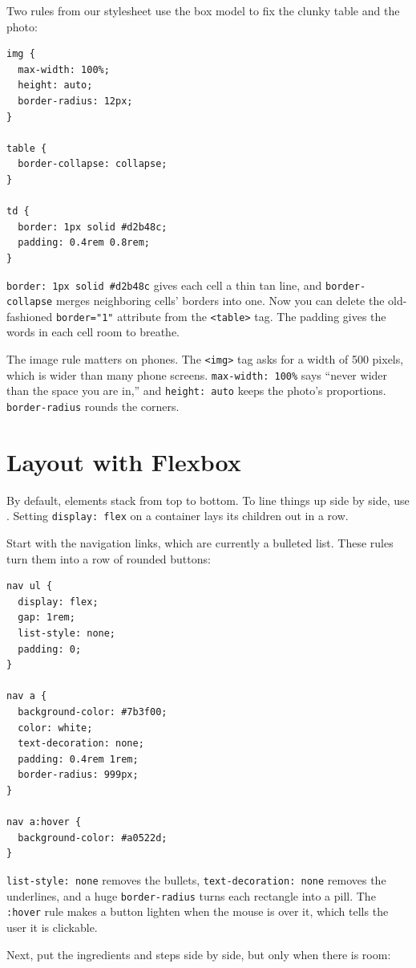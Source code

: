 Two rules from our stylesheet use the box model to fix the clunky table and the photo:

\begin{verbatim}
img {
  max-width: 100%;
  height: auto;
  border-radius: 12px;
}

table {
  border-collapse: collapse;
}

td {
  border: 1px solid #d2b48c;
  padding: 0.4rem 0.8rem;
}
\end{verbatim}

\verb|border: 1px solid #d2b48c| gives each cell a thin tan line, and \verb|border-collapse| merges
neighboring cells' borders into one. Now you can delete the old-fashioned \verb|border="1"| attribute from
the \verb|<table>| tag. The padding gives the words in each cell room to breathe.

The image rule matters on phones. The \verb|<img>| tag asks for a width of 500 pixels, which is wider than
many phone screens. \verb|max-width: 100%| says ``never wider than the space you are in,'' and
\verb|height: auto| keeps the photo's proportions. \verb|border-radius| rounds the corners.

\section{Layout with Flexbox}
By default, elements stack from top to bottom. To line things up side by side, use
. Setting \verb|display: flex| on a container lays its children out in a row.

Start with the navigation links, which are currently a bulleted list. These rules turn them into a row of
rounded buttons:

\begin{verbatim}
nav ul {
  display: flex;
  gap: 1rem;
  list-style: none;
  padding: 0;
}

nav a {
  background-color: #7b3f00;
  color: white;
  text-decoration: none;
  padding: 0.4rem 1rem;
  border-radius: 999px;
}

nav a:hover {
  background-color: #a0522d;
}
\end{verbatim}

\verb|list-style: none| removes the bullets, \verb|text-decoration: none| removes the underlines, and a
huge \verb|border-radius| turns each rectangle into a pill. The \verb|:hover| rule makes a button lighten
when the mouse is over it, which tells the user it is clickable.

Next, put the ingredients and steps side by side, but only when there is room:

